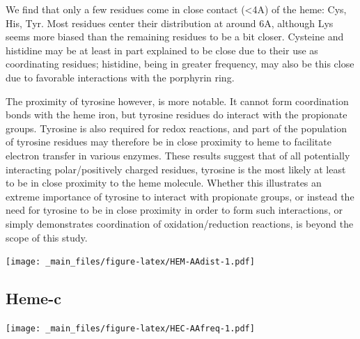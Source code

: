 \documentclass[a4paper, nobind]{templates/ociamthesis}
\let\origfigure\figure
\let\endorigfigure\endfigure
\renewenvironment{figure}[1][2] {
    \expandafter\origfigure\expandafter[H]
} {
    \endorigfigure
}
\begin{document}
We find that only a few residues come in close contact (\textless4A) of the heme: Cys, His, Tyr. Most residues center their distribution at around 6A, although Lys seems more biased than the remaining residues to be a bit closer. Cysteine and histidine may be at least in part explained to be close due to their use as coordinating residues; histidine, being in greater frequency, may also be this close due to favorable interactions with the porphyrin ring.

The proximity of tyrosine however, is more notable. It cannot form coordination bonds with the heme iron, but tyrosine residues do interact with the propionate groups. Tyrosine is also required for redox reactions, and part of the population of tyrosine residues may therefore be in close proximity to heme to facilitate electron transfer in various enzymes\autocite{Poulos2014}. These results suggest that of all potentially interacting polar/positively charged residues, tyrosine is the most likely at least to be in close proximity to the heme molecule. Whether this illustrates an extreme importance of tyrosine to interact with propionate groups, or instead the need for tyrosine to be in close proximity in order to form such interactions, or simply demonstrates coordination of oxidation/reduction reactions, is beyond the scope of this study.

\begin{figure}
\centering
\texttt{[image: \_main\_files/figure-latex/HEM-AAdist-1.pdf]}
\caption{\label{fig:HEM-AAdist}HEM: AA Distances}
\end{figure}

\hypertarget{heme-c-1}{%
\subsection{Heme-c}\label{heme-c-1}}

\begin{figure}
\centering
\texttt{[image: \_main\_files/figure-latex/HEC-AAfreq-1.pdf]}
\caption{\label{fig:HEC-AAfreq}HEC: AA Frequency}
\end{figure}
\end{document}
